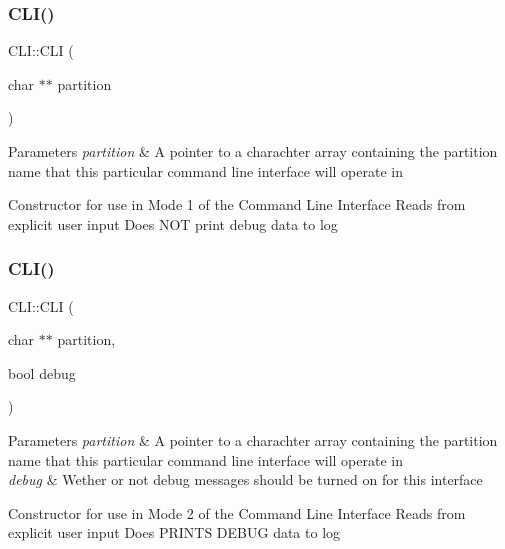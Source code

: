 \subsubsection{\texorpdfstring{C\+L\+I()}{CLI()}\hspace{0.1cm}{\footnotesize\ttfamily [1/4]}}
{\footnotesize\ttfamily C\+L\+I\+::\+C\+LI (\begin{DoxyParamCaption}\item[{char $\ast$$\ast$}]{partition }\end{DoxyParamCaption})}


\begin{DoxyParams}{Parameters}
{\em partition} & A pointer to a charachter array containing the partition name that this particular command line interface will operate in\\
\hline
\end{DoxyParams}
Constructor for use in Mode 1 of the Command Line Interface Reads from explicit user input Does N\+OT print debug data to log \mbox{\label{classCLI_aeafaa56f2b2d8c97121ed52125e3fa9a}} 
\subsubsection{\texorpdfstring{C\+L\+I()}{CLI()}\hspace{0.1cm}{\footnotesize\ttfamily [2/4]}}
{\footnotesize\ttfamily C\+L\+I\+::\+C\+LI (\begin{DoxyParamCaption}\item[{char $\ast$$\ast$}]{partition,  }\item[{bool}]{debug }\end{DoxyParamCaption})}


\begin{DoxyParams}{Parameters}
{\em partition} & A pointer to a charachter array containing the partition name that this particular command line interface will operate in\\
\hline
{\em debug} & Wether or not debug messages should be turned on for this interface\\
\hline
\end{DoxyParams}
Constructor for use in Mode 2 of the Command Line Interface Reads from explicit user input Does P\+R\+I\+N\+TS D\+E\+B\+UG data to log \mbox{\label{classCLI_a4eb5e9a1c695edf4dcc705b9c12a0a8d}} 
